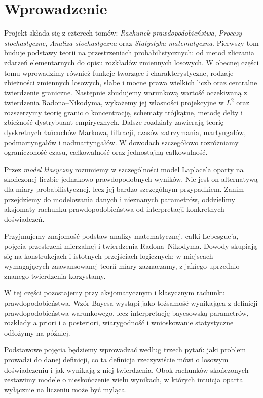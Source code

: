 \chapter*{Wprowadzenie}
Projekt składa się z czterech tomów: \emph{Rachunek prawdopodobieństwa}, \emph{Procesy stochastyczne}, \emph{Analiza stochastyczna} oraz \emph{Statystyka matematyczna}.
Pierwszy tom buduje podstawy teorii na przestrzeniach probabilistycznych:
od metod zliczania zdarzeń elementarnych do opisu rozkładów zmiennych losowych.
W obecnej części tomu wprowadzimy również funkcje tworzące i charakterystyczne,
rodzaje zbieżności zmiennych losowych, słabe i mocne prawa wielkich liczb
oraz centralne twierdzenie graniczne. Następnie zbudujemy
warunkową wartość oczekiwaną z twierdzenia Radona--Nikodyma,
wykażemy jej własności projekcyjne w $L^2$ oraz rozszerzymy
teorię granic o koncentrację, schematy trójkątne,
metodę delty i zbieżność dystrybuant empirycznych.
Dalsze rozdziały zawierają teorię dyskretnych łańcuchów Markowa,
filtracji, czasów zatrzymania, martyngałów, podmartyngałów i nadmartyngałów.
W dowodach szczegółowo rozróżniamy ograniczoność czasu,
całkowalność oraz jednostajną całkowalność.

Przez \emph{model klasyczny} rozumiemy w szczególności model
Laplace'a oparty na skończonej liczbie jednakowo prawdopodobnych
wyników. Nie jest on alternatywą dla miary probabilistycznej,
lecz jej bardzo szczególnym przypadkiem. Zanim przejdziemy do
modelowania danych i nieznanych parametrów, oddzielimy aksjomaty
rachunku prawdopodobieństwa od interpretacji konkretnych doświadczeń.

Przyjmujemy znajomość podstaw analizy matematycznej, całki Lebesgue'a,
pojęcia przestrzeni mierzalnej i twierdzenia Radona--Nikodyma.
Dowody skupiają się na konstrukcjach i istotnych przejściach logicznych;
w miejscach wymagających zaawansowanej teorii miary zaznaczamy, z jakiego
uprzednio znanego twierdzenia korzystamy.

W tej części pozostajemy przy aksjomatycznym i klasycznym rachunku
prawdopodobieństwa. Wzór Bayesa wystąpi jako tożsamość wynikająca
z definicji prawdopodobieństwa warunkowego, lecz interpretację
bayesowską parametrów, rozkłady a priori i a posteriori,
wiarygodność i wnioskowanie statystyczne odłożymy na później.

Podstawowe pojęcia będziemy wprowadzać według trzech pytań: jaki
problem prowadzi do danej definicji, co ta definicja rzeczywiście
mówi o losowym doświadczeniu i jak wynikają z niej twierdzenia.
Obok rachunków skończonych zestawimy modele o nieskończenie
wielu wynikach, w których intuicja oparta wyłącznie na liczeniu
może być myląca.

